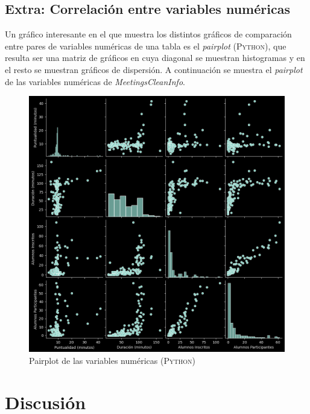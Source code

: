 \documentclass[11pt,a4paper]{book}
\theoremstyle{definition}%
\begin{document}
            \section{Extra: Correlación entre variables numéricas}
                Un gráfico interesante en el que muestra los distintos gráficos de comparación entre pares de variables numéricas de una tabla es el \textit{pairplot} (\textsc{Python}), que resulta ser una matriz de gráficos en cuya diagonal se muestran histogramas y en el resto se muestran gráficos de dispersión. A continuación se muestra el \textit{pairplot} de las variables numéricas de \textit{MeetingsCleanInfo}.
                \begin{figure}[H]
                    \centering
                    \includegraphics[width=1\textwidth]{Sources/pairplot_NumericalData.png}
                    \caption{Pairplot de las variables numéricas (\textsc{Python})}
                    \label{fig:pairplot_NumericalData}
                \end{figure}
    \chapter{Discusión}        
        
\end{document}
